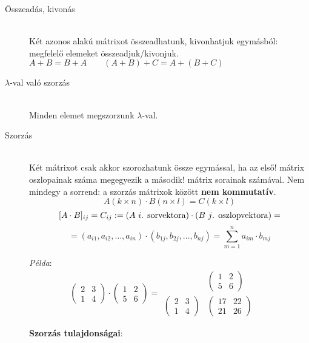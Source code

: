 \documentclass[a4paper,12pt,twoside]{book}
\theoremstyle{break}
\begin{document}
\begin{description}
 \item[Összeadás, kivonás] \hfill\\
  Két azonos alakú mátrixot összeadhatunk, kivonhatjuk egymásból: megfelelő elemeket összeadjuk/kivonjuk.\\
  $A+B = B+A \qquad (A+B)+C = A+(B+C)$
 \item[$\lambda$-val való szorzás] \hfill\\
  Minden elemet megszorzunk $\lambda$-val.
 \item[Szorzás] \hfill\\
  Két mátrixot csak akkor szorozhatunk össze egymással, ha az első! mátrix oszlopainak száma megegyezik a második! mátrix sorainak számával. Nem mindegy a sorrend: a szorzás mátrixok között \textbf{nem kommutatív}.
  \[A(k\times n)\cdot B(n\times l) = C(k\times l)\]
  \[[A\cdot B]_{ij} = C_{ij} := \hbox{($A$ $i$. sorvektora)}\cdot\hbox{($B$ $j$. oszlopvektora)} = \]
  \[= (a_{i1}, a_{i2}, \ldots, a_{in})\cdot(b_{1j}, b_{2j}, \ldots, b_{nj}) = \sum^{n}_{m=1} a_{im}\cdot b_{mj}\]

\emph{Példa}:
\[\begin{pmatrix}
2 & 3 \\
1 & 4
\end{pmatrix}\cdot
\begin{pmatrix}
1 & 2 \\
5 & 6
\end{pmatrix}=
\begin{matrix}
& \begin{pmatrix}
1 & 2 \\
5 & 6
\end{pmatrix} & & \\

\begin{pmatrix}
2 & 3 \\
1 & 4
\end{pmatrix} &
\begin{pmatrix}
17 & 22 \\
21 & 26
\end{pmatrix}
\end{matrix}\]

\textbf{Szorzás tulajdonságai}:
\end{description}
\end{document}
